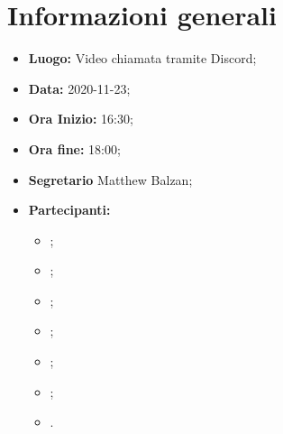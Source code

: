   \section{Informazioni generali}
	\begin{itemize}
		\item \textbf{Luogo:} Video chiamata tramite Discord;
		\item \textbf{Data:} 2020-11-23;
		\item \textbf{Ora Inizio:} 16:30;
		\item \textbf{Ora fine:} 18:00;
		\item \textbf{Segretario} Matthew Balzan;
		\item \textbf{Partecipanti:}
		\begin{itemize}
			\item \MB;
			\item \VAS;
			\item \FD;
			\item \NM;
			\item \SB;
			\item \GB;
			\item \MDI.
		\end{itemize}
		
	\end{itemize}